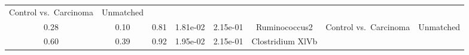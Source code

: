 \documentclass[12pt,]{article}
\begin{document}
\begin{longtable}[]{@{}cccccccc@{}}
\begin{minipage}[t]{0.14\columnwidth}
Control vs.~Carcinoma\strut
\end{minipage} & \begin{minipage}[t]{0.09\columnwidth}\centering\strut
Unmatched\strut
\end{minipage}\tabularnewline
\begin{minipage}[t]{0.05\columnwidth}\centering\strut
0.28\strut
\end{minipage} & \begin{minipage}[t]{0.09\columnwidth}\centering\strut
0.10\strut
\end{minipage} & \begin{minipage}[t]{0.09\columnwidth}\centering\strut
0.81\strut
\end{minipage} & \begin{minipage}[t]{0.07\columnwidth}\centering\strut
1.81e-02\strut
\end{minipage} & \begin{minipage}[t]{0.07\columnwidth}\centering\strut
2.15e-01\strut
\end{minipage} & \begin{minipage}[t]{0.20\columnwidth}\centering\strut
Ruminococcus2\strut
\end{minipage} & \begin{minipage}[t]{0.14\columnwidth}\centering\strut
Control vs.~Carcinoma\strut
\end{minipage} & \begin{minipage}[t]{0.09\columnwidth}\centering\strut
Unmatched\strut
\end{minipage}\tabularnewline
\begin{minipage}[t]{0.05\columnwidth}\centering\strut
0.60\strut
\end{minipage} & \begin{minipage}[t]{0.09\columnwidth}\centering\strut
0.39\strut
\end{minipage} & \begin{minipage}[t]{0.09\columnwidth}\centering\strut
0.92\strut
\end{minipage} & \begin{minipage}[t]{0.07\columnwidth}\centering\strut
1.95e-02\strut
\end{minipage} & \begin{minipage}[t]{0.07\columnwidth}\centering\strut
2.15e-01\strut
\end{minipage} & \begin{minipage}[t]{0.20\columnwidth}\centering\strut
Clostridium XlVb\strut
\end{minipage} & \begin{minipage}[t]{0.14\columnwidth}\centering\strut

\end{minipage}
\end{longtable}
\end{document}
